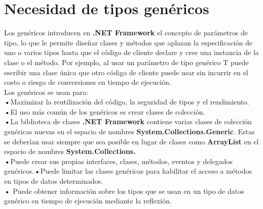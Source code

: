 \documentclass[12pt,a4paper]{report}
\begin{document}
\section{Necesidad de tipos genéricos}
Los genéricos introducen en\textbf{ .NET Framework} el concepto de parámetros de tipo, lo que le permite diseñar clases y métodos que aplazan la especificación de uno o varios tipos hasta que el código de cliente declare y cree una instancia de la clase o el método. Por ejemplo, al usar un parámetro de tipo genérico T puede escribir una clase única que otro código de cliente puede usar sin incurrir en el costo o riesgo de conversiones en tiempo de ejecución.\\Los genéricos se usan para:\\\textbf{•}Maximizar la reutilización del código, la seguridad de tipos y el rendimiento.\\\textbf{•}El uso más común de los genéricos es crear clases de colección.\\\textbf{•}La biblioteca de clases\textbf{ .NET Framework} contiene varias clases de colección genéricas nuevas en el espacio de nombres\textbf{ System.Collections.Generic}. Estas se deberían usar siempre que sea posible en lugar de clases como\textbf{ ArrayList} en el espacio de nombres\textbf{ System.Collections.}\\\textbf{•}Puede crear sus propias interfaces, clases, métodos, eventos y delegados genéricos.\textbf{•}Puede limitar las clases genéricas para habilitar el acceso a métodos en tipos de datos determinados.\\\textbf{•} Puede obtener información sobre los tipos que se usan en un tipo de datos genérico en tiempo de ejecución mediante la reflexión.
\end{document}
